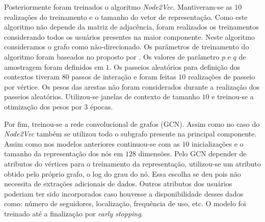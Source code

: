 Posteriormente foram treinados o algoritmo \textit{Node2Vec}.
Mantiveram-se as $10$ realizações do treinamento e o tamanho do vetor de
representação.
Como este algoritmo não depende da matriz de adjacência, foram realizados os
treinamentos considerando todos os usuários presentes na maior componente.
Neste algoritmo consideramos o grafo como não-direcionado.
Os parâmetros de treinamento do algoritmo foram baseados no proposto por
\citet{grover16}.
Os valores de parâmetro $p$ e $q$ de amostragem foram definidos em $1$.
Os passeios aleatórios para definição dos contextos tiveram $80$ passos
de interação e foram feitas $10$ realizações de passeio por vértice.
Os pesos das arestas não foram considerados durante a realização dos passeios
aleatórios.
Utilizou-se janelas de contexto de tamanho $10$ e treinou-se a otimização dos
pesos por $3$ épocas.

Por fim, treinou-se a rede convolucional de grafos (GCN).
Assim como no caso do \textit{Node2Vec} também se utilizou todo o subgrafo
presente na principal componente.
Assim como nos modelos anteriores continuou-se com as $10$ inicializações e o
tamanho da representação dos nós em $128$ dimensões.
Pelo GCN depender de atributos do vértices para o treinamento da representação,
utilizou-se um atributo obtido pelo próprio grafo, o log do grau do nó.
Essa escolha se deu pois não necessita de extrações adicionais de dados.
Outros atributos dos usuários poderiam ter sido incorporados caso houvesse a
disponibilidade desses dados como: número de seguidores, localização,
frequência de uso, etc.
O modelo foi treinado até a finalização por \textit{early stopping}.


